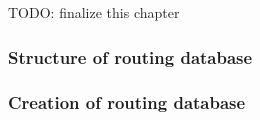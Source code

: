 TODO: finalize this chapter\newline

\subsubsection{Structure of routing database}


\subsubsection{Creation of routing database}